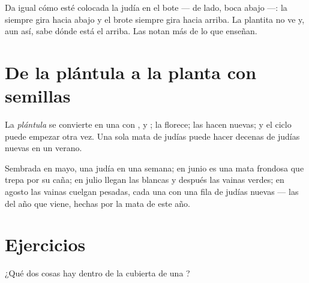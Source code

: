 \begin{remark}\label{rem:g2:from-seed-to-plant:updown}
Da igual cómo esté colocada la judía en el bote --- de lado, boca
abajo ---: la  siempre gira hacia abajo y el brote siempre gira
hacia arriba. La plantita no ve y, aun así, sabe dónde está el arriba.
Las  notan más de lo que enseñan.
\end{remark}

\section{De la plántula a la planta con semillas}

\begin{proposition}\label{prop:g2:from-seed-to-plant:cycle}
La \emph{plántula} se convierte en una  con
,  y ; la  florece; las  hacen
\emph{} nuevas; y el ciclo puede empezar otra vez. Una sola
mata de judías puede hacer decenas de judías nuevas en un verano.
\end{proposition}
\admitted

\begin{example}\label{ex:g2:from-seed-to-plant:summer}
Sembrada en mayo, una judía  en una semana; en junio es una
mata frondosa que trepa por su caña; en julio llegan las 
blancas y después las vainas verdes; en agosto las vainas cuelgan
pesadas, cada una con una fila de judías nuevas --- las  del
año que viene, hechas por la mata de este año.
\end{example}

\section{Ejercicios}

\begin{exercise}[$\star$]\label{exo:g2:from-seed-to-plant:1}
¿Qué dos cosas hay dentro de la cubierta de una ?
\end{exercise}

